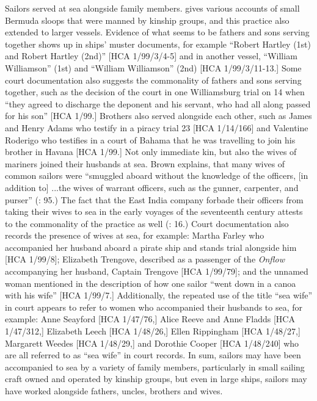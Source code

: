   Sailors served at sea alongside family members. \citet{Jarvis2010} gives various accounts of small Bermuda sloops that were manned by kinship groups, and this practice also extended to larger vessels. Evidence of what seems to be fathers and sons serving together shows up in ships’ muster documents, for example “Robert Hartley (1st) and Robert Hartley (2nd)” [HCA 1/99/3/4-5] and in another vessel, “William Williamson” (1st) and “William Williamson” (2nd) [HCA 1/99/3/11-13.] Some court documentation also suggests the commonality of fathers and sons serving together, such as the decision of the court in one Williamsburg trial on 14 \citealt{August1729} when “they agreed to discharge the deponent and his servant, who had all along passed for his son” [HCA 1/99.]  Brothers also served alongside each other, such as James and Henry Adams who testify in a piracy trial 23 \citealt{October1699} [HCA 1/14/166] and Valentine Roderigo who testifies in a court of Bahama \citealt{Island1722} that he was travelling to join his brother in Havana [HCA 1/99.] Not only immediate kin, but also the wives of mariners joined their husbands at sea. Brown explains, that many wives of common sailors were “smuggled aboard without the knowledge of the officers, [in addition to] ...the wives of warrant officers, such as the gunner, carpenter, and purser” (\citealt{Brown2011}: 95.) The fact that the East India company forbade their officers from taking their wives to sea in the early voyages of the seventeenth century attests to the commonality of the practice as well (\citealt{Fury2015}: 16.) Court documentation also records the presence of wives at sea, for example: Martha Farley who accompanied her husband aboard a pirate ship and stands trial alongside him [HCA 1/99/8]; Elizabeth Trengove, described as a passenger of the \textit{Onflow} accompanying her husband, Captain Trengove [HCA 1/99/79]; and the unnamed woman mentioned in the description of how one sailor “went down in a canoa with his wife” [HCA 1/99/7.] Additionally, the repeated use of the title “sea wife” in court appears to refer to women who accompanied their husbands to sea, for example: Anne Seayford [HCA 1/47/76,] Alice Reeve and Anne Fladds [HCA 1/47/312,] Elizabeth Leech [HCA 1/48/26,] Ellen Rippingham [HCA 1/48/27,] Margarett Weedes [HCA 1/48/29,] and Dorothie Cooper [HCA 1/48/240] who are all referred to as “sea wife” in court records. In sum, sailors may have been accompanied to sea by a variety of family members, particularly in small sailing craft owned and operated by kinship groups, but even in large ships, sailors may have worked alongside fathers, uncles, brothers and wives. 

